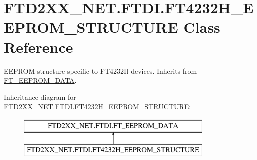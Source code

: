 \hypertarget{class_f_t_d2_x_x___n_e_t_1_1_f_t_d_i_1_1_f_t4232_h___e_e_p_r_o_m___s_t_r_u_c_t_u_r_e}{}\section{F\+T\+D2\+X\+X\+\_\+\+N\+E\+T.\+F\+T\+D\+I.\+F\+T4232\+H\+\_\+\+E\+E\+P\+R\+O\+M\+\_\+\+S\+T\+R\+U\+C\+T\+U\+RE Class Reference}
\label{class_f_t_d2_x_x___n_e_t_1_1_f_t_d_i_1_1_f_t4232_h___e_e_p_r_o_m___s_t_r_u_c_t_u_r_e}


E\+E\+P\+R\+OM structure specific to F\+T4232H devices. Inherits from \mbox{\hyperlink{class_f_t_d2_x_x___n_e_t_1_1_f_t_d_i_1_1_f_t___e_e_p_r_o_m___d_a_t_a}{F\+T\+\_\+\+E\+E\+P\+R\+O\+M\+\_\+\+D\+A\+TA}}.  


Inheritance diagram for F\+T\+D2\+X\+X\+\_\+\+N\+E\+T.\+F\+T\+D\+I.\+F\+T4232\+H\+\_\+\+E\+E\+P\+R\+O\+M\+\_\+\+S\+T\+R\+U\+C\+T\+U\+RE\+:\begin{figure}[H]
\begin{center}
\leavevmode
\includegraphics[height=2.000000cm]{class_f_t_d2_x_x___n_e_t_1_1_f_t_d_i_1_1_f_t4232_h___e_e_p_r_o_m___s_t_r_u_c_t_u_r_e}
\end{center}
\end{figure}
